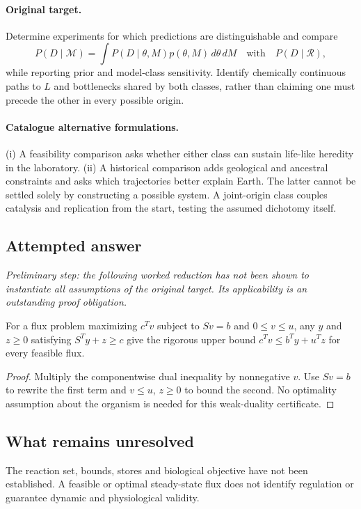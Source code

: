 \documentclass[11pt]{article}
\begin{document}
\paragraph{Original target.}
Determine experiments for which predictions are distinguishable and compare
\[
P(D\mid\mathcal M)=\int P(D\mid\theta,M)p(\theta,M)\,d\theta\,dM
\quad\text{with}\quad P(D\mid\mathcal R),
\]
while reporting prior and model-class sensitivity. Identify chemically continuous paths to $L$ and bottlenecks shared by both classes, rather than claiming one must precede the other in every possible origin.
\paragraph{Catalogue alternative formulations.}
(i) A feasibility comparison asks whether either class can sustain life-like heredity in the laboratory. (ii) A historical comparison adds geological and ancestral constraints and asks which trajectories better explain Earth. The latter cannot be settled solely by constructing a possible system. A joint-origin class couples catalysis and replication from the start, testing the assumed dichotomy itself.
\subsection{Attempted answer}
\noindent\emph{Preliminary step: the following worked reduction has not been shown to instantiate all assumptions of the original target. Its applicability is an outstanding proof obligation.}

\begin{proposition}
For a flux problem maximizing $c^Tv$ subject to $Sv=b$ and $0\leq v\leq u$, any $y$ and $z\geq0$ satisfying $S^Ty+z\geq c$ give the rigorous upper bound $c^Tv\leq b^Ty+u^Tz$ for every feasible flux.
\end{proposition}
\begin{proof}
Multiply the componentwise dual inequality by nonnegative $v$. Use $Sv=b$ to rewrite the first term and $v\leq u$, $z\geq0$ to bound the second. No optimality assumption about the organism is needed for this weak-duality certificate.
\end{proof}
\subsection{What remains unresolved}
The reaction set, bounds, stores and biological objective have not been established. A feasible or optimal steady-state flux does not identify regulation or guarantee dynamic and physiological validity.
\end{document}
